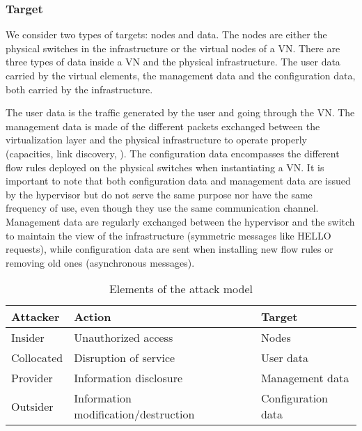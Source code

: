 \subsubsection{Target}
We consider two types of targets: nodes and data.
The nodes are either the physical switches in the infrastructure or the virtual nodes of a VN.
There are three types of data inside a VN and the physical infrastructure.
The user data carried by the virtual elements, the management data and the configuration data, both carried by the infrastructure. 

The user data is the traffic generated by the user and going through the VN.
The management data is made of the different packets exchanged between the virtualization layer and the physical infrastructure to operate properly (capacities, link discovery, \etc).
The configuration data encompasses the different flow rules deployed on the physical switches when instantiating a VN.
It is important to note that both configuration data and management data are issued by the hypervisor but do not serve the same purpose nor have the same frequency of use, even though they use the same communication channel.
Management data are regularly exchanged between the hypervisor and the switch to maintain the view of the infrastructure (\eg symmetric messages like HELLO requests), while configuration data are sent when installing new flow rules or removing old ones (asynchronous messages).

\begin{table}[h]
\centering
\begin{tabular}{|l|l|l|}
\hline
\textbf{Attacker}   & \textbf{Action}    & \textbf{Target}             \\ \hline
Insider    & Unauthorized access                  & Nodes              \\ \hline
Collocated & Disruption of service                & User data          \\ \hline
Provider   & Information disclosure               & Management data    \\ \hline
Outsider   & Information modification/destruction & Configuration data \\ \hline
\end{tabular}
\caption{Elements of the attack model}
\label{tab:attack-model}
\end{table}

